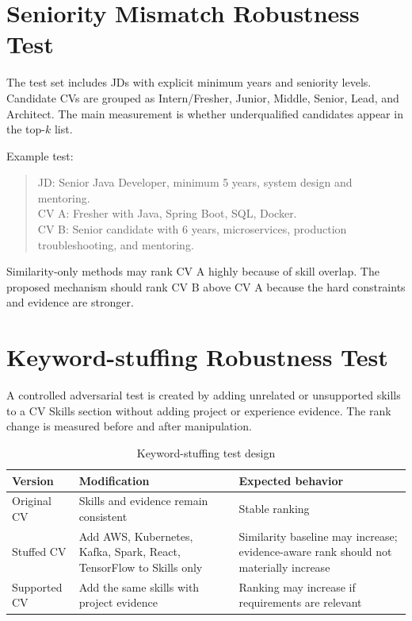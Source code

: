 \documentclass[12pt,a4paper,oneside]{report}
\begin{document}
\section{Seniority Mismatch Robustness Test}
The test set includes JDs with explicit minimum years and seniority levels. Candidate CVs are grouped as Intern/Fresher, Junior, Middle, Senior, Lead, and Architect. The main measurement is whether underqualified candidates appear in the top-$k$ list.

Example test:
\begin{quote}
JD: Senior Java Developer, minimum 5 years, system design and mentoring.\\
CV A: Fresher with Java, Spring Boot, SQL, Docker.\\
CV B: Senior candidate with 6 years, microservices, production troubleshooting, and mentoring.
\end{quote}

Similarity-only methods may rank CV A highly because of skill overlap. The proposed mechanism should rank CV B above CV A because the hard constraints and evidence are stronger.

\section{Keyword-stuffing Robustness Test}
A controlled adversarial test is created by adding unrelated or unsupported skills to a CV Skills section without adding project or experience evidence. The rank change is measured before and after manipulation.

\begin{table}[htbp]
\centering
\caption{Keyword-stuffing test design}
\label{tab:stuffing}
\begin{tabularx}{\textwidth}{p{}XX}
\toprule
Version & Modification & Expected behavior \\
\midrule
Original CV & Skills and evidence remain consistent & Stable ranking \\
Stuffed CV & Add AWS, Kubernetes, Kafka, Spark, React, TensorFlow to Skills only & Similarity baseline may increase; evidence-aware rank should not materially increase \\
Supported CV & Add the same skills with project evidence & Ranking may increase if requirements are relevant \\
\bottomrule
\end{tabularx}
\end{table}
\end{document}
